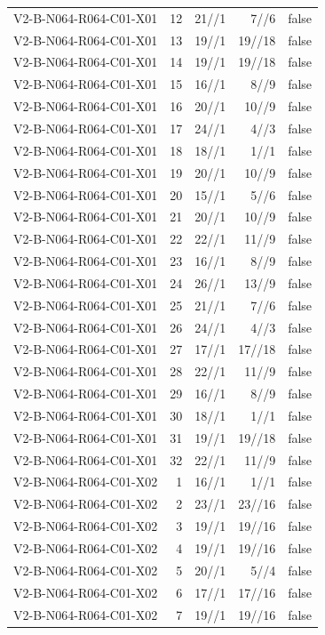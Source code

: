 {\begin{longtable}{lrrrr}
V2-B-N064-R064-C01-X01 & 12 & 21//1 & 7//6 & false \\
V2-B-N064-R064-C01-X01 & 13 & 19//1 & 19//18 & false \\
V2-B-N064-R064-C01-X01 & 14 & 19//1 & 19//18 & false \\
V2-B-N064-R064-C01-X01 & 15 & 16//1 & 8//9 & false \\
V2-B-N064-R064-C01-X01 & 16 & 20//1 & 10//9 & false \\
V2-B-N064-R064-C01-X01 & 17 & 24//1 & 4//3 & false \\
V2-B-N064-R064-C01-X01 & 18 & 18//1 & 1//1 & false \\
V2-B-N064-R064-C01-X01 & 19 & 20//1 & 10//9 & false \\
V2-B-N064-R064-C01-X01 & 20 & 15//1 & 5//6 & false \\
V2-B-N064-R064-C01-X01 & 21 & 20//1 & 10//9 & false \\
V2-B-N064-R064-C01-X01 & 22 & 22//1 & 11//9 & false \\
V2-B-N064-R064-C01-X01 & 23 & 16//1 & 8//9 & false \\
V2-B-N064-R064-C01-X01 & 24 & 26//1 & 13//9 & false \\
V2-B-N064-R064-C01-X01 & 25 & 21//1 & 7//6 & false \\
V2-B-N064-R064-C01-X01 & 26 & 24//1 & 4//3 & false \\
V2-B-N064-R064-C01-X01 & 27 & 17//1 & 17//18 & false \\
V2-B-N064-R064-C01-X01 & 28 & 22//1 & 11//9 & false \\
V2-B-N064-R064-C01-X01 & 29 & 16//1 & 8//9 & false \\
V2-B-N064-R064-C01-X01 & 30 & 18//1 & 1//1 & false \\
V2-B-N064-R064-C01-X01 & 31 & 19//1 & 19//18 & false \\
V2-B-N064-R064-C01-X01 & 32 & 22//1 & 11//9 & false \\
V2-B-N064-R064-C01-X02 & 1 & 16//1 & 1//1 & false \\
V2-B-N064-R064-C01-X02 & 2 & 23//1 & 23//16 & false \\
V2-B-N064-R064-C01-X02 & 3 & 19//1 & 19//16 & false \\
V2-B-N064-R064-C01-X02 & 4 & 19//1 & 19//16 & false \\
V2-B-N064-R064-C01-X02 & 5 & 20//1 & 5//4 & false \\
V2-B-N064-R064-C01-X02 & 6 & 17//1 & 17//16 & false \\
V2-B-N064-R064-C01-X02 & 7 & 19//1 & 19//16 & false \\

\end{longtable}}
